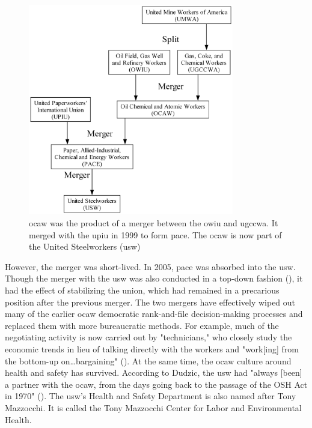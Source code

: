 \documentclass[12pt]{article}
\newcommand{\imageWidth}{0.8\textwidth}
\begin{document}
\begin{figure}[!ht]
  \centering
  \includegraphics[width=\imageWidth]{images/ocaw}
  \captionsetup{justification=centering, singlelinecheck=false, margin=2cm} 
  \caption[Oil Chemical and Atomic Workers Mergers]{\acrfull{ocaw} was the product of a merger between the \acrshort{owiu} and \acrfull{ugccwa}. It merged with the \acrfull{upiu} in 1999 to form \acrshort{pace}. The \acrshort{ocaw} is now part of the United Steelworkers (\acrshort{usw})}
  \label{fig:ocaw}
\end{figure}

However, the merger was short-lived. In 2005, \acrshort{pace} was absorbed into the \acrfull{usw}. Though the merger with the \acrshort{usw} was also conducted in a top-down fashion (\cite{dudzicInterview2024}), it had the effect of stabilizing the union, which had remained in a precarious position after the previous merger. The two mergers have effectively wiped out many of the earlier \acrshort{ocaw} democratic rank-and-file decision-making processes and replaced them with more bureaucratic methods. For example, much of the negotiating activity is now carried out by "technicians," who closely study the economic trends in lieu of talking directly with the workers and "work[ing] from the bottom-up on\ldots{}bargaining" (\cite{dudzicInterview2024}). At the same time, the \acrshort{ocaw} culture around health and safety has survived. According to Dudzic, the \acrshort{usw} had "always [been] a partner with the \acrshort{ocaw}, from the days going back to the passage of the OSH Act in 1970" (\cite{dudzicInterview2024}). The \acrshort{usw}’s Health and Safety Department is also named after Tony Mazzocchi. It is called the Tony Mazzocchi Center for Labor and Environmental Health.
\end{document}
